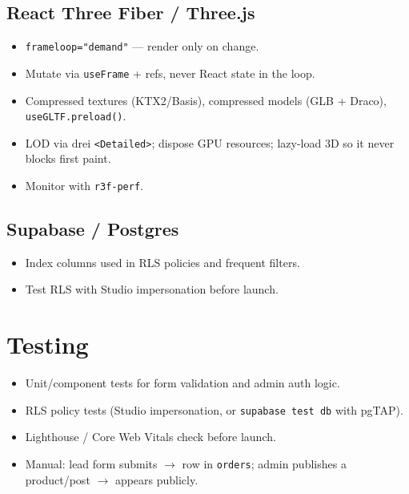 \documentclass[11pt,a4paper]{article}
\begin{document}
\subsection{React Three Fiber / Three.js}
\begin{itemize}
  \item \texttt{frameloop="demand"} --- render only on change.
  \item Mutate via \texttt{useFrame} + refs, never React state in the loop.
  \item Compressed textures (KTX2/Basis), compressed models (GLB + Draco), \texttt{useGLTF.preload()}.
  \item LOD via drei \texttt{<Detailed>}; dispose GPU resources; lazy-load 3D so it never blocks first paint.
  \item Monitor with \texttt{r3f-perf}.
\end{itemize}
\subsection{Supabase / Postgres}
\begin{itemize}
  \item Index columns used in RLS policies and frequent filters.
  \item Test RLS with Studio impersonation before launch.
\end{itemize}

\section{Testing}
\begin{itemize}
  \item Unit/component tests for form validation and admin auth logic.
  \item RLS policy tests (Studio impersonation, or \texttt{supabase test db} with pgTAP).
  \item Lighthouse / Core Web Vitals check before launch.
  \item Manual: lead form submits $\rightarrow$ row in \texttt{orders}; admin publishes a product/post
        $\rightarrow$ appears publicly.
\end{itemize}

\end{document}
